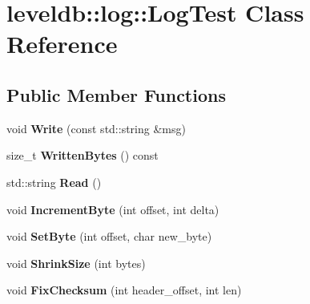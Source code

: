 \hypertarget{classleveldb_1_1log_1_1_log_test}{}\section{leveldb\+:\+:log\+:\+:Log\+Test Class Reference}
\label{classleveldb_1_1log_1_1_log_test}
\subsection*{Public Member Functions}
\begin{DoxyCompactItemize}
\item 
\mbox{\label{classleveldb_1_1log_1_1_log_test_ab8af1c9335e7fbb42e06a6c01de2d0fc}} 
void {\bfseries Write} (const std\+::string \&msg)
\item 
\mbox{\label{classleveldb_1_1log_1_1_log_test_a602824b02f9220d6813768f6f700db47}} 
size\+\_\+t {\bfseries Written\+Bytes} () const
\item 
\mbox{\label{classleveldb_1_1log_1_1_log_test_a2f5deb8b04200600ac0bc7cd3e39bd57}} 
std\+::string {\bfseries Read} ()
\item 
\mbox{\label{classleveldb_1_1log_1_1_log_test_aee52d93f17cf3e23b2ae11bd9a5f5652}} 
void {\bfseries Increment\+Byte} (int offset, int delta)
\item 
\mbox{\label{classleveldb_1_1log_1_1_log_test_a2f3545c3cd495bb60b4322fa045b897c}} 
void {\bfseries Set\+Byte} (int offset, char new\+\_\+byte)
\item 
\mbox{\label{classleveldb_1_1log_1_1_log_test_a2f19ddba7e239badc63920c6fb496823}} 
void {\bfseries Shrink\+Size} (int bytes)
\item 
\mbox{\label{classleveldb_1_1log_1_1_log_test_ac966525faded349590f1a1ae738844cf}} 
void {\bfseries Fix\+Checksum} (int header\+\_\+offset, int len)
\item 
\mbox{\label{classleveldb_1_1log_1_1_log_test_a817eeeba2beef1d81dac83badb9f1049}} 

\end{DoxyCompactItemize}
